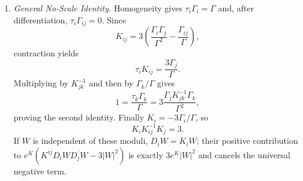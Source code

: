 \begin{enumerate}
\begin{enumerate}
      Hence a zero-energy stationary locus is
      \[
        C=0,\qquad W+\alpha sA=0,
        \quad\text{or}\quad
        b=-(1+\alpha s)ae^{-\alpha S}.
      \]
      On this locus \(F^S=F^C=0\), whereas
      \[
        F^T=e^{K/2}t\,\overline W
      \]
      is nonzero for generic \(a,b\).  Supersymmetry is therefore broken
      with zero classical vacuum energy.  The complex modulus \(T\) is
      undetermined subject only to \(t>0\); both its real scale and axionic
      direction are tree-level flat.
    \item \emph{General No-Scale Identity.}
    Homogeneity gives
      \(\tau_i\Gamma_i=\Gamma\) and, after differentiation,
      \(\tau_i\Gamma_{ij}=0\).  Since
      \[
        K_{ij}=3\left(
          \frac{\Gamma_i\Gamma_j}{\Gamma^2}
          -\frac{\Gamma_{ij}}{\Gamma}\right),
      \]
      contraction yields
      \[
        \tau_iK_{ij}=\frac{3\Gamma_j}{\Gamma}.
      \]
      Multiplying by \(K^{-1}_{jk}\) and then by
      \(\Gamma_k/\Gamma\) gives
      \[
        1=\frac{\tau_k\Gamma_k}{\Gamma}
          =3\frac{\Gamma_jK^{-1}_{jk}\Gamma_k}{\Gamma^2},
      \]
      proving the second identity.  Finally
      \(K_i=-3\Gamma_i/\Gamma\), so
      \[
        K_iK^{-1}_{ij}K_j=3.
      \]
      If \(W\) is independent of these moduli, \(D_iW=K_iW\);
      their positive contribution to
      \(e^K(K^{i\bar j}D_iW\overline{D_jW}-3|W|^2)\) is exactly
      \(3e^K|W|^2\) and cancels the universal negative term.
  \end{enumerate}


\end{enumerate}
